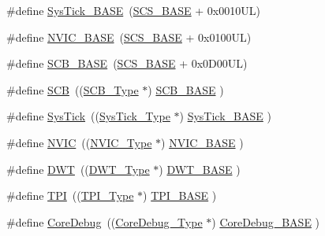 \begin{DoxyCompactItemize}
\item 
\#define \hyperlink{group___c_m_s_i_s__core__base_ga58effaac0b93006b756d33209e814646}{Sys\+Tick\+\_\+\+B\+A\+SE}~(\hyperlink{group___c_m_s_i_s__core__base_ga3c14ed93192c8d9143322bbf77ebf770}{S\+C\+S\+\_\+\+B\+A\+SE} +  0x0010\+U\+L)
\item 
\#define \hyperlink{group___c_m_s_i_s__core__base_gaa0288691785a5f868238e0468b39523d}{N\+V\+I\+C\+\_\+\+B\+A\+SE}~(\hyperlink{group___c_m_s_i_s__core__base_ga3c14ed93192c8d9143322bbf77ebf770}{S\+C\+S\+\_\+\+B\+A\+SE} +  0x0100\+U\+L)
\item 
\#define \hyperlink{group___c_m_s_i_s__core__base_gad55a7ddb8d4b2398b0c1cfec76c0d9fd}{S\+C\+B\+\_\+\+B\+A\+SE}~(\hyperlink{group___c_m_s_i_s__core__base_ga3c14ed93192c8d9143322bbf77ebf770}{S\+C\+S\+\_\+\+B\+A\+SE} +  0x0\+D00\+U\+L)
\item 
\#define \hyperlink{group___c_m_s_i_s__core__base_gaaaf6477c2bde2f00f99e3c2fd1060b01}{S\+CB}~((\hyperlink{struct_s_c_b___type}{S\+C\+B\+\_\+\+Type}       $\ast$)     \hyperlink{group___c_m_s_i_s__core__base_gad55a7ddb8d4b2398b0c1cfec76c0d9fd}{S\+C\+B\+\_\+\+B\+A\+SE}         )
\item 
\#define \hyperlink{group___c_m_s_i_s__core__base_gacd96c53beeaff8f603fcda425eb295de}{Sys\+Tick}~((\hyperlink{struct_sys_tick___type}{Sys\+Tick\+\_\+\+Type}   $\ast$)     \hyperlink{group___c_m_s_i_s__core__base_ga58effaac0b93006b756d33209e814646}{Sys\+Tick\+\_\+\+B\+A\+SE}     )
\item 
\#define \hyperlink{group___c_m_s_i_s__core__base_gac8e97e8ce56ae9f57da1363a937f8a17}{N\+V\+IC}~((\hyperlink{struct_n_v_i_c___type}{N\+V\+I\+C\+\_\+\+Type}      $\ast$)     \hyperlink{group___c_m_s_i_s__core__base_gaa0288691785a5f868238e0468b39523d}{N\+V\+I\+C\+\_\+\+B\+A\+SE}        )
\item 
\#define \hyperlink{group___c_m_s_i_s__core__base_gabbe5a060185e1d5afa3f85b14e10a6ce}{D\+WT}~((\hyperlink{struct_d_w_t___type}{D\+W\+T\+\_\+\+Type}       $\ast$)     \hyperlink{group___c_m_s_i_s__core__base_gafdab534f961bf8935eb456cb7700dcd2}{D\+W\+T\+\_\+\+B\+A\+SE}         )
\item 
\#define \hyperlink{group___c_m_s_i_s__core__base_ga8b4dd00016aed25a0ea54e9a9acd1239}{T\+PI}~((\hyperlink{struct_t_p_i___type}{T\+P\+I\+\_\+\+Type}       $\ast$)     \hyperlink{group___c_m_s_i_s__core__base_ga2b1eeff850a7e418844ca847145a1a68}{T\+P\+I\+\_\+\+B\+A\+SE}         )
\item 
\#define \hyperlink{group___c_m_s_i_s__core__base_gab6e30a2b802d9021619dbb0be7f5d63d}{Core\+Debug}~((\hyperlink{struct_core_debug___type}{Core\+Debug\+\_\+\+Type} $\ast$)     \hyperlink{group___c_m_s_i_s__core__base_ga680604dbcda9e9b31a1639fcffe5230b}{Core\+Debug\+\_\+\+B\+A\+SE}   )

\end{DoxyCompactItemize}
